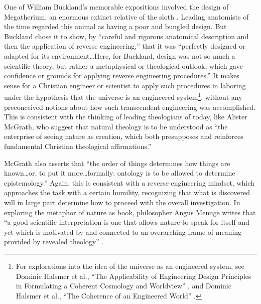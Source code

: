 One of William Buckland’s memorable expositions involved the design of
Megatherium, an enormous extinct relative of the
sloth \citep[][p.~245]{roberts1999}.
Leading anatomists of the time regarded this
animal as having a poor and bungled design. But Buckland chose it to
show, by ``careful and rigorous anatomical description and then the
application of reverse engineering,'' that it was ``perfectly designed or
adapted for its environment{\ldots}Here, for Buckland, design was not so much
a scientific theory, but rather a metaphysical or theological outlook,
which gave confidence or grounds for applying reverse engineering
procedures.''\citep[][p.~248]{roberts1999}
It makes sense for a Christian
engineer or scientist to apply such procedures in laboring under the
hypothesis that the universe is an engineered
system\footnote{
For explorations into the idea of the universe as an
engineered system, see Dominic Halsmer et al., ``The Applicability of
Engineering Design Principles in Formulating a Coherent Cosmology and
Worldview'' , and Dominic Halsmer et al., ``The Coherence of an
Engineered World'' .
}, without any preconceived notions about how
such transcendent engineering was accomplished. This is consistent with
the thinking of leading theologians of today, like Alister McGrath, who
suggest that natural theology is to be understood as ``the enterprise of
seeing nature as creation, which both presupposes and reinforces
fundamental Christian theological affirmations.''\citep[][p.~64]{mcgrath2006}

McGrath also asserts that ``the order of things determines how things are
known{\ldots}or, to put it more{\ldots}formally: ontology is to be allowed to
determine epistemology.''\citep[][pp. xv--xvi]{mcgrath2006} Again, this is consistent
with a reverse engineering mindset, which approaches the task with a
certain humility, recognizing that what is discovered will in large
part determine how to proceed with the overall investigation. In
exploring the metaphor of nature as book, philosopher Angus Menuge
writes that ``a good scientific interpretation is one that allows nature
to speak for itself and yet which is motivated by and connected to an
overarching frame of meaning provided by revealed
theology'' \citep[][p.~96]{menuge2003}.

